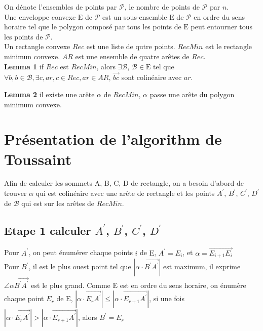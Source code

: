 \documentclass[14px]{article}
\begin{document}
On dénote l'ensembles de points par $\mathcal{P}$, le nombre de points de $\mathcal{P}$ par $n$.\\
Une enveloppe convexe $\mathrm{E}$ de $\mathcal{P}$ est un sous-ensemble $\mathrm{E}$ de $\mathcal{P}$ en ordre du sens horaire tel que le polygon composé par tous les points de $\mathrm{E}$ peut entourner tous les points de $\mathcal{P}$.\\
Un rectangle convexe $Rec$ est une liste de qutre points. $RecMin$ est le rectangle minimun convexe. $AR$ est une ensemble de quatre arêtes de $Rec$.\\

\textbf{Lemma 1} if $Rec$ est $RecMin$, alors $\exists \mathcal{B}$, $\mathcal{B} \in \mathrm{E}$ tel que $\forall b, b \in \mathcal{B},\exists c, ar, c \in Rec, ar\in AR$, $\overrightarrow{bc}$ sont colinéaire avec $ar$.

\textbf{Lemma 2} il existe une arête $\alpha$ de $RecMin$, $\alpha$ passe une arête du polygon minimum convexe.


\section{Présentation de l'algorithm de Toussaint}
Afin de calculer les sommets A, B, C, D de rectangle, on a besoin d'abord de trouver $\alpha$ qui est colinéaire avec une arête de rectangle et les points $A^{\prime}$,  $B^{\prime}$, $C^{\prime}$, $D^{\prime}$ de $\mathcal{B}$ qui est sur les arêtes de $RecMin$.

\subsection{Etape 1 calculer $A^{\prime}$,  $B^{\prime}$, $C^{\prime}$, $D^{\prime}$}
Pour $A^{\prime}$, on peut énumérer chaque points $i$ de $\mathrm{E}$, $A^{\prime} = E_{i}$,
et $\alpha = \overrightarrow{E_{i+1}E_{i}}$ \\

Pour $B^{\prime}$, il est le plus ouest point tel que $|\alpha \cdot \overrightarrow{B^{\prime}A^{\prime}}|$ est maximum, il exprime $\angle \alpha\overrightarrow{B^{\prime}A^{\prime}}$ est le plus grand. Comme $\mathrm{E}$ est en ordre du sens horaire, on énumère chaque point $E_{r}$ de $\mathrm{E}$, $|\alpha\cdot\overrightarrow{E_{r}A^{\prime}}| \leqslant |\alpha\cdot\overrightarrow{E_{r+1}A^{\prime}}|$, si une fois $|\alpha\cdot\overrightarrow{E_{r}A^{\prime}}| > |\alpha\cdot\overrightarrow{E_{r+1}A^{\prime}}|$, alors $B^{\prime} = E_{r}$\\
\end{document}
